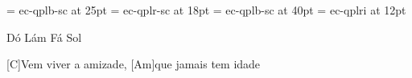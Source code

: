 



\def\TextFontName{ec-qplr } %
\def\RefFontName{ec-qplb }
\def\AnnotationFontName{ec-qplb }

\font\TitleFont = ec-qplb-sc at 25pt
\font\AuthorFont = ec-qplr-sc at 18pt
\font\InitialFont = ec-qplb-sc at 40pt
\font\FootlineFont = ec-qplri at 12pt

\PortugueseChordStyle



Dó
Lám
Fá
Sol

[C]Vem viver a amizade, [Am]que jamais tem idade

\esong

\bye
